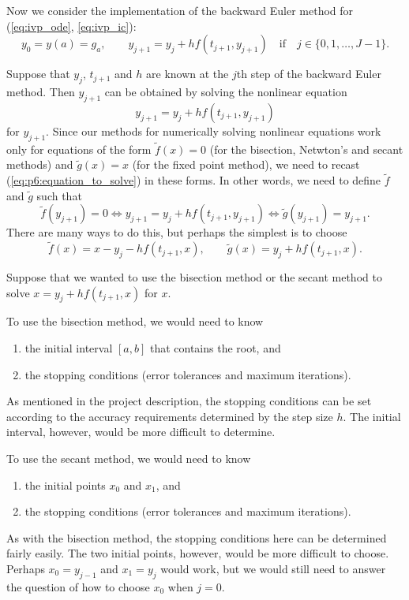 \documentclass{homework}
\begin{document}
	Now we consider the implementation of the backward Euler method for (\ref{eq:ivp_ode}, \ref{eq:ivp_ic}):
	\begin{equation}
		y_0 = y(a) = g_a, \qquad y_{j+1} = y_j + hf(t_{j+1}, y_{j+1}) \quad\text{if}\quad j \in \{0,1,\dots, J-1\}.
	\end{equation}
	
	\question
	\newcommand{\newf}{\tilde{f}}
	\newcommand{\newg}{\tilde{g}}
	Suppose that $y_j$, $t_{j+1}$ and $h$ are known at the $j$th step of the backward Euler method. Then $y_{j+1}$ can be obtained by solving the nonlinear equation
	\begin{equation}
		\label{eq:p6:equation_to_solve}
		y_{j+1} = y_j + hf(t_{j+1}, y_{j+1})
	\end{equation}
	for $y_{j+1}$. Since our methods for numerically solving nonlinear equations work only for equations of the form $\newf(x) = 0$ (for the bisection, Netwton's and secant methods) and $\newg(x) = x$ (for the fixed point method), we need to recast (\ref{eq:p6:equation_to_solve}) in these forms. In other words, we need to define $\newf$ and $\newg$ such that
	\begin{equation}
		\newf(y_{j+1}) = 0 \iff y_{j+1} = y_j + hf(t_{j+1}, y_{j+1}) \iff \newg(y_{j+1}) = y_{j+1}.
	\end{equation}
	There are many ways to do this, but perhaps the simplest is to choose
	\begin{equation}
		\newf(x) = x - y_j - hf(t_{j+1}, x),\qquad \newg(x) = y_j + hf(t_{j+1}, x).
	\end{equation}
	
	\question
	Suppose that we wanted to use the bisection method or the secant method to solve $x = y_j + hf(t_{j+1}, x)$ for $x$.
	\begin{alphaparts}
		\questionpart To use the bisection method, we would need to know
		\begin{enumerate}[label=(\arabic*)]
			\item the initial interval $[a,b]$ that contains the root, and
			\item the stopping conditions (error tolerances and maximum iterations).
		\end{enumerate}
		As mentioned in the project description, the stopping conditions can be set according to the accuracy requirements determined by the step size $h$. The initial interval, however, would be more difficult to determine.
		
		\questionpart
		To use the secant method, we would need to know
		\begin{enumerate}[label=(\arabic*)]
			\item the initial points $x_0$ and $x_1$, and
			\item the stopping conditions (error tolerances and maximum iterations).
		\end{enumerate}
		As with the bisection method, the stopping conditions here can be determined fairly easily. The two initial points, however, would be more difficult to choose. Perhaps $x_0 = y_{j-1}$ and $x_1 = y_j$ would work, but we would still need to answer the question of how to choose $x_0$ when $j=0$.
	\end{alphaparts}
	
	\question
	\begin{alphaparts}
		\questionpart
		
	\end{alphaparts}
\end{document}

